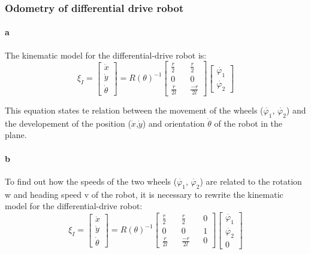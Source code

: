 \documentclass[12pt]{article}
\begin{document}
\subsubsection{Odometry of differential drive robot}
\paragraph{a} The kinematic model for the differential-drive robot is:
\begin{equation}
\xi_I = 
\begin{bmatrix} \dot{x} \\ \dot{y} \\ \dot{\theta} \end{bmatrix}
= 
R(\theta)^{-1}
\begin{bmatrix} \frac{r}{2} && \frac{r}{2} \\ 
0 && 0  \\ 
\frac{r}{2l} && \frac{-r}{2l}\end{bmatrix}
\begin{bmatrix}
\dot{\varphi_1} \\
\dot{\varphi_2}
\end{bmatrix}
\end{equation}

This equation states te relation between the movement of the wheels ($\dot{\varphi_1}$, $\dot{\varphi_2}$) and the developement of the position ($\dot{x}$,$\dot{y}$) and orientation $\dot{\theta}$ of the robot in the plane.

\paragraph{b}
To find out how the speeds of the two wheels ($\dot{\varphi_1}$, $\dot{\varphi_2}$) are related to the rotation w and heading speed v of the robot, it is necessary to rewrite the kinematic model for the differential-drive robot:
\begin{equation}
\xi_I = 
\begin{bmatrix} \dot{x} \\ \dot{y} \\ \dot{\theta} \end{bmatrix}
= 
R(\theta)^{-1}
\begin{bmatrix} \frac{r}{2} && \frac{r}{2} && 0 \\ 
0 && 0  && 1\\ 
\frac{r}{2l} && \frac{-r}{2l} && 0\end{bmatrix}
\begin{bmatrix}
\dot{\varphi_1} \\
\dot{\varphi_2} \\
0
\end{bmatrix}
\end{equation}
\end{document}

